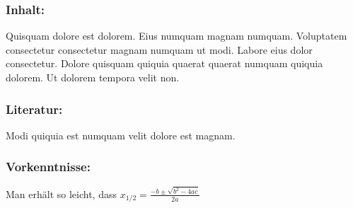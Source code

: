 \subsubsection*{\Large Inhalt:}
Quisquam dolore est dolorem. Eius numquam magnam numquam. Voluptatem consectetur consectetur magnam numquam ut modi. Labore eius dolor consectetur. Dolore quisquam quiquia quaerat quaerat numquam quiquia dolorem. Ut dolorem tempora velit non.
\subsubsection*{\Large Literatur:}
Modi quiquia est numquam velit dolore est magnam.
\subsubsection*{\Large Vorkenntnisse:}
Man erhält so leicht, dass $x_{1/2} = \frac{-b \pm \sqrt{b^2 - 4ac}}{2a}$
